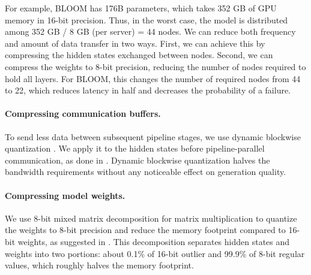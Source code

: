 For example, BLOOM has 176B parameters, which takes 352 GB of GPU memory in 16-bit precision. Thus, in the worst case, the model is distributed among 352 GB / 8 GB (per server) = 44 nodes. We can reduce both frequency and amount of data transfer in two ways.
First, we can achieve this by compressing the hidden states exchanged between nodes. Second, we can compress the weights to 8-bit precision, reducing the number of nodes required to hold all layers. For BLOOM, this changes the number of required nodes from 44 to 22, which reduces latency in half and decreases the probability of a failure.

\paragraph{Compressing communication buffers.} To send less data between subsequent pipeline stages, we use dynamic blockwise quantization \citep{dettmers2022optimizers}. We apply it to the hidden states before pipeline-parallel communication, as done in \citet{ryabinin2021swarm}. Dynamic blockwise quantization halves the bandwidth requirements without any noticeable effect on generation quality.

\paragraph{Compressing model weights.} We use 8-bit mixed matrix decomposition for matrix multiplication to quantize the weights to 8-bit precision and reduce the memory footprint compared to 16-bit weights, as suggested in \cite{dettmers2022llm}. This decomposition separates hidden states and weights into two portions: about 0.1\% of 16-bit outlier and 99.9\% of 8-bit regular values, which roughly halves the memory footprint.



